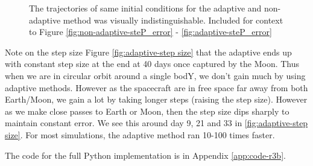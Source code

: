 \begin{figure}
{        }
        \caption{The trajectories of same initial conditions for the adaptive and non-adaptive method was visually indistinguishable. Included for context to Figure \ref{fig:non-adaptive-steP_error} - \ref{fig:adaptive-steP_error}}
        \label{fig:adaptive-xY_XY}
\end{figure}


Note on the step size Figure \ref{fig:adaptive-step size} that the adaptive ends up with constant step size at the end at 40 days once captured by the Moon. Thus when we are in circular orbit around a single bodY, we don't gain much by using adaptive methods. However as the spacecraft are in free space far away from both Earth/Moon, we gain a lot by taking longer steps (raising the step size). However as we make close passes to Earth or Moon, then the step size dips sharply to maintain constant error. We see this around day 9, 21 and 33 in \ref{fig:adaptive-step size}. For most simulations, the adaptive method ran 10-100 times faster.

The code for the full Python implementation is in Appendix \ref{app:code-r3b}.
